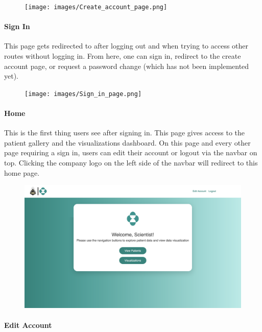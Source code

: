 \documentclass[]{book}
\let\oldparagraph\paragraph
\renewcommand{\paragraph}[1]{\oldparagraph{#1}\mbox{}}
\begin{document}
\begin{figure}
\centering
\texttt{[image: images/Create\_account\_page.png]}
\caption{}
\end{figure}

\paragraph{Sign In}\label{sign-in}

This page gets redirected to after logging out and when trying to access
other routes without logging in. From here, one can sign in, redirect to
the create account page, or request a password change (which has not
been implemented yet).

\begin{figure}
\centering
\texttt{[image: images/Sign\_in\_page.png]}
\caption{}
\end{figure}

\paragraph{Home}\label{home}

This is the first thing users see after signing in. This page gives
access to the patient gallery and the visualizations dashboard. On this
page and every other page requiring a sign in, users can edit their
account or logout via the navbar on top. Clicking the company logo on
the left side of the navbar will redirect to this home page.

\begin{figure}
\centering
\includegraphics{images/home_page.png}
\caption{}
\end{figure}

\paragraph{Edit Account}\label{edit-account}
\end{document}

